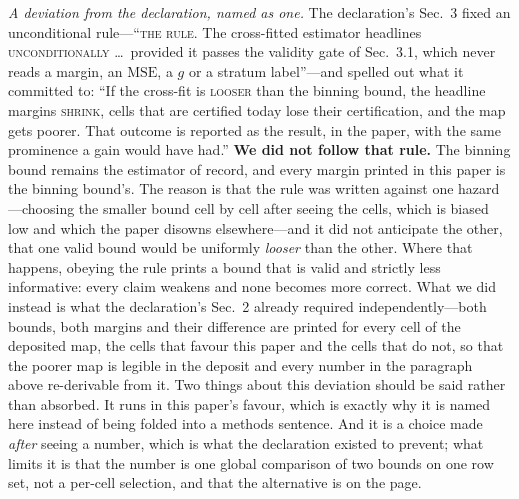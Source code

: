 \label{par:crossfit-deviation}
\emph{A deviation from the declaration, named as one.} The declaration's Sec.~3 fixed an
unconditional rule---``\textsc{the rule}. The cross-fitted estimator headlines
\textsc{unconditionally} \ldots\ provided it passes the validity gate of Sec.~3.1, which never
reads a margin, an $\mathrm{MSE}$, a $g$ or a stratum label''---and spelled out what it committed
to: ``If the cross-fit is \textsc{looser} than the binning bound, the headline margins
\textsc{shrink}, cells that are certified today lose their certification, and the map gets poorer.
That outcome is reported as the result, in the paper, with the same prominence a gain would have
had.'' \textbf{We did not follow that rule.} The binning bound remains the estimator of record, and
every margin printed in this paper is the binning bound's. The reason is that the rule was written
against one hazard---choosing the smaller bound cell by cell after seeing the cells, which is
biased low and which the paper disowns elsewhere---and it did not anticipate the other, that one
valid bound would be uniformly \emph{looser} than the other. Where that happens, obeying the rule
prints a bound that is valid and strictly less informative: every claim weakens and none becomes
more correct. What we did instead is what the declaration's Sec.~2 already required
independently---both bounds, both margins and their difference are printed for every cell of the
deposited map, the cells that favour this paper and the cells that do not, so that the poorer map
is legible in the deposit and every number in the
paragraph above re-derivable from it. Two things about this deviation should be said rather than absorbed. It runs in
this paper's favour, which is exactly why it is named here instead of being folded into a methods
sentence. And it is a choice made \emph{after} seeing a number, which is what the declaration
existed to prevent; what limits it is that the number is one global comparison of two bounds on one
row set, not a per-cell selection, and that the alternative is on the page.

